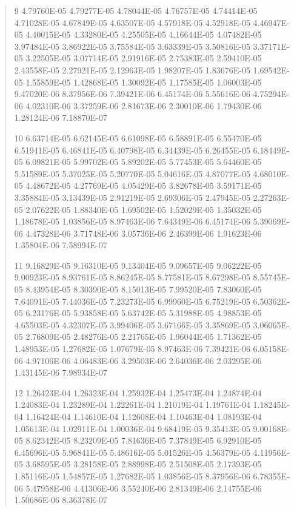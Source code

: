 \documentclass[letterpaper,10pt,english]{sphinxmanual}
\begin{document}
\begin{quote}
\begin{DUlineblock}{0em}
\begin{DUlineblock}{\DUlineblockindent}
\item[] 9   4.79760E-05  4.79277E-05  4.78044E-05  4.76757E-05  4.74414E-05  4.71028E-05  4.67849E-05  4.63507E-05  4.57918E-05  4.52918E-05  4.46947E-05  4.40015E-05  4.33280E-05  4.25505E-05  4.16644E-05  4.07482E-05  3.97484E-05  3.86922E-05  3.75584E-05  3.63339E-05  3.50816E-05  3.37171E-05  3.22505E-05  3.07714E-05  2.91916E-05  2.75383E-05  2.59410E-05  2.43558E-05  2.27921E-05  2.12963E-05  1.98207E-05  1.83676E-05  1.69542E-05  1.55859E-05  1.42868E-05  1.30092E-05  1.17585E-05  1.06003E-05  9.47020E-06  8.37956E-06  7.39421E-06  6.45174E-06  5.55616E-06  4.75294E-06  4.02310E-06  3.37259E-06  2.81673E-06  2.30010E-06  1.79430E-06  1.28124E-06  7.18870E-07
\end{DUlineblock}
\item[] 10   6.63714E-05  6.62145E-05  6.61098E-05  6.58891E-05  6.55470E-05  6.51941E-05  6.46841E-05  6.40798E-05  6.34439E-05  6.26455E-05  6.18449E-05  6.09821E-05  5.99702E-05  5.89202E-05  5.77453E-05  5.64460E-05  5.51589E-05  5.37025E-05  5.20770E-05  5.04616E-05  4.87077E-05  4.68010E-05  4.48672E-05  4.27769E-05  4.05429E-05  3.82678E-05  3.59171E-05  3.35884E-05  3.13439E-05  2.91219E-05  2.69306E-05  2.47945E-05  2.27263E-05  2.07622E-05  1.88340E-05  1.69502E-05  1.52029E-05  1.35032E-05  1.18678E-05  1.03856E-05  8.97463E-06  7.64349E-06  6.45174E-06  5.39069E-06  4.47328E-06  3.71748E-06  3.05736E-06  2.46399E-06  1.91623E-06  1.35804E-06  7.58994E-07
\item[] 11   9.16829E-05  9.16310E-05  9.13404E-05  9.09657E-05  9.06222E-05  9.00923E-05  8.93761E-05  8.86245E-05  8.77581E-05  8.67298E-05  8.55745E-05  8.43954E-05  8.30390E-05  8.15013E-05  7.99520E-05  7.83060E-05  7.64091E-05  7.44036E-05  7.23273E-05  6.99960E-05  6.75219E-05  6.50362E-05  6.23176E-05  5.93858E-05  5.63742E-05  5.31988E-05  4.98853E-05  4.65503E-05  4.32307E-05  3.99406E-05  3.67166E-05  3.35869E-05  3.06065E-05  2.76809E-05  2.48276E-05  2.21765E-05  1.96044E-05  1.71362E-05  1.48953E-05  1.27682E-05  1.07679E-05  8.97463E-06  7.39421E-06  6.05158E-06  4.97106E-06  4.06483E-06  3.29503E-06  2.64036E-06  2.03295E-06  1.43145E-06  7.98934E-07
\item[] 12   1.26423E-04  1.26323E-04  1.25932E-04  1.25473E-04  1.24874E-04  1.24083E-04  1.23289E-04  1.22261E-04  1.21019E-04  1.19761E-04  1.18245E-04  1.16424E-04  1.14610E-04  1.12608E-04  1.10463E-04  1.08193E-04  1.05613E-04  1.02911E-04  1.00036E-04  9.68419E-05  9.35413E-05  9.00168E-05  8.62342E-05  8.23209E-05  7.81636E-05  7.37849E-05  6.92910E-05  6.45696E-05  5.96841E-05  5.48616E-05  5.01526E-05  4.56379E-05  4.11956E-05  3.68595E-05  3.28158E-05  2.88998E-05  2.51508E-05  2.17393E-05  1.85116E-05  1.54857E-05  1.27682E-05  1.03856E-05  8.37956E-06  6.78355E-06  5.47958E-06  4.41306E-06  3.55240E-06  2.81349E-06  2.14755E-06  1.50686E-06  8.36378E-07

\end{DUlineblock}
\end{quote}
\end{document}
